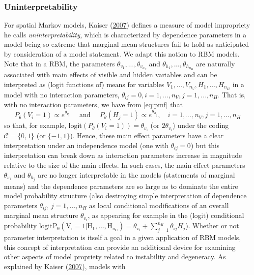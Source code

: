 \documentclass[]{article}
\theoremstyle{definition}
\newcommand{\nv}{{n_{\scriptscriptstyle V}}}
\newcommand{\nh}{{n_{\scriptscriptstyle H}}}
\begin{document}
\hypertarget{uninterpretability}{%
\subsubsection{Uninterpretability}\label{uninterpretability}}

For spatial Markov models, Kaiser
(\protect\hyperlink{ref-kaiser2007statistical}{2007}) defines a measure
of model impropriety he calls \emph{uninterpretability}, which is
characterized by dependence parameters in a model being so extreme that
marginal mean-structures fail to hold as anticipated by consideration of
a model statement. We adapt this notion to RBM models. Note that in a
RBM, the parameters \(\theta_{v_1}, \dots, \theta_{v_\nv}\) and
\(\theta_{h_1}, \dots, \theta_{h_\nh}\) are naturally associated with
main effects of visible and hidden variables and can be interpreted as
(logit functions of) means for variables
\(V_1, \dots, V_\nv, H_1, \dots, H_\nh\) in a model with no interaction
parameters, \(\theta_{ij} = 0, i = 1, \dots, \nv, j = 1, \dots, \nh\).
That is, with no interaction parameters, we have from \eqref{eq:pmf} that
\[
P_\theta(V_i=1) \propto e^{\theta_{v_i}} \quad \text{ and } \quad P_\theta(H_j=1) \propto e^{\theta_{h_j}}, \quad  i=1,\ldots,\nv,j=1,\ldots,\nh
\] so that, for example, \(\text{logit}(P_\theta(V_i=1))=\theta_{v_i}\)
(or \(2 \theta_{v_i}\)) under the coding \(\mathcal{C}=\{0,1\}\) (or
\(\{-1,1\}\)). Hence, these main effect parameters have a clear
interpretation under an independence model (one with
\(\theta_{ij} = 0\)) but this interpretation can break down as
interaction parameters increase in magnitude relative to the size of the
main effects. In such cases, the main effect parameters \(\theta_{v_1}\)
and \(\theta_{h_j}\) are no longer interpretable in the models
(statements of marginal means) and the dependence parameters are so
large as to dominate the entire model probability structure (also
destroying simple interpretation of dependence parameters
\(\theta_{ij}\), \(j=1,\ldots,\nh\) as local conditional modifications
of an overall marginal mean structure \(\theta_{v_i}\), as appearing for
example in the (logit) conditional probability
\(\mathrm{logit P_\theta(V_i=1|H_1,\ldots,H_{\nh})}= \theta_{v_i} + \sum_{j=1}^{\nh} \theta_{ij} H_j\)).
Whether or not parameter interpretation is itself a goal in a given
application of RBM models, this concept of interpretation can provide an
additional device for examining other aspects of model propriety related
to instability and degeneracy. As explained by Kaiser
(\protect\hyperlink{ref-kaiser2007statistical}{2007}), models with
\end{document}
